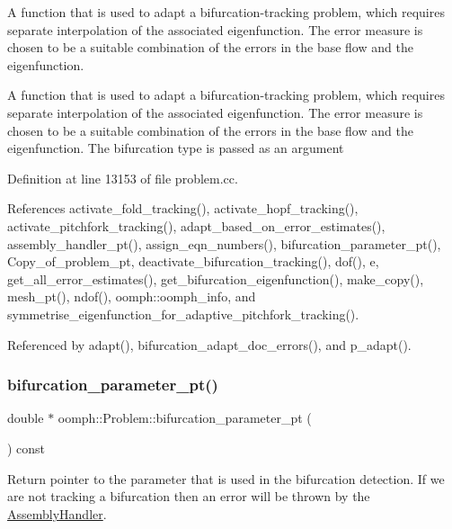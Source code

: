 A function that is used to adapt a bifurcation-\/tracking problem, which requires separate interpolation of the associated eigenfunction. The error measure is chosen to be a suitable combination of the errors in the base flow and the eigenfunction. 

A function that is used to adapt a bifurcation-\/tracking problem, which requires separate interpolation of the associated eigenfunction. The error measure is chosen to be a suitable combination of the errors in the base flow and the eigenfunction. The bifurcation type is passed as an argument 

Definition at line 13153 of file problem.\+cc.



References activate\+\_\+fold\+\_\+tracking(), activate\+\_\+hopf\+\_\+tracking(), activate\+\_\+pitchfork\+\_\+tracking(), adapt\+\_\+based\+\_\+on\+\_\+error\+\_\+estimates(), assembly\+\_\+handler\+\_\+pt(), assign\+\_\+eqn\+\_\+numbers(), bifurcation\+\_\+parameter\+\_\+pt(), Copy\+\_\+of\+\_\+problem\+\_\+pt, deactivate\+\_\+bifurcation\+\_\+tracking(), dof(), e, get\+\_\+all\+\_\+error\+\_\+estimates(), get\+\_\+bifurcation\+\_\+eigenfunction(), make\+\_\+copy(), mesh\+\_\+pt(), ndof(), oomph\+::oomph\+\_\+info, and symmetrise\+\_\+eigenfunction\+\_\+for\+\_\+adaptive\+\_\+pitchfork\+\_\+tracking().



Referenced by adapt(), bifurcation\+\_\+adapt\+\_\+doc\+\_\+errors(), and p\+\_\+adapt().

\mbox{\label{classoomph_1_1Problem_a3cf79b3067d1d794062ebb27e414dea9}} 
\subsubsection{\texorpdfstring{bifurcation\+\_\+parameter\+\_\+pt()}{bifurcation\_parameter\_pt()}}
{\footnotesize\ttfamily double $\ast$ oomph\+::\+Problem\+::bifurcation\+\_\+parameter\+\_\+pt (\begin{DoxyParamCaption}{ }\end{DoxyParamCaption}) const}



Return pointer to the parameter that is used in the bifurcation detection. If we are not tracking a bifurcation then an error will be thrown by the \hyperlink{classoomph_1_1AssemblyHandler}{Assembly\+Handler}. 

